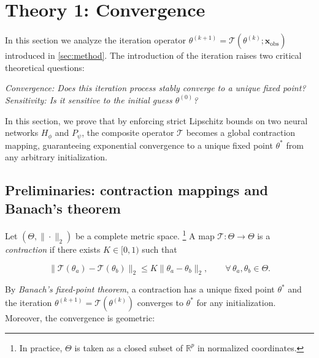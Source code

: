 
\section{Theory 1: Convergence}
\label{sec:convergence}

In this section we analyze the iteration operator
$\theta^{(k+1)} = \mathcal{T}(\theta^{(k)};\mathbf{x}_\mathrm{obs})$
introduced in \ref{sec:method}.
The introduction of the iteration raises two critical theoretical questions:

\emph{Convergence: Does this iteration process stably converge to a unique fixed point?}
\emph{Sensitivity: Is it sensitive to the initial guess $\theta^{(0)}$?}

In this section, we prove that by enforcing strict Lipschitz bounds on two neural networks $H_\phi$ and $P_\psi$, the composite operator $\mathcal{T}$ becomes a global contraction mapping, guaranteeing exponential convergence to a unique fixed point $\theta^*$ from any arbitrary initialization.

\subsection{Preliminaries: contraction mappings and Banach's theorem}
\label{subsec:banach}

Let $(\Theta,\|\cdot\|_2)$ be a complete metric space.
\footnote{In practice, $\Theta$ is taken as a closed subset of $\mathbb{R}^p$ in normalized coordinates.}
A map $\mathcal{T}:\Theta\to\Theta$ is a \textit{contraction} if there exists $K\in[0,1)$ such that

\begin{equation}
\label{eq:contraction-def}
    \lVert \mathcal{T}(\theta_a)-\mathcal{T}(\theta_b)\|_2 \le K\|\theta_a-\theta_b\rVert_2,
    \qquad \forall\,\theta_a,\theta_b\in\Theta.
\end{equation}

By \emph{Banach's fixed-point theorem}, a contraction has a unique fixed point $\theta^*$ and the iteration
$\theta^{(k+1)}=\mathcal{T}(\theta^{(k)})$ converges to $\theta^*$ for any initialization. 
Moreover, the convergence is geometric:

